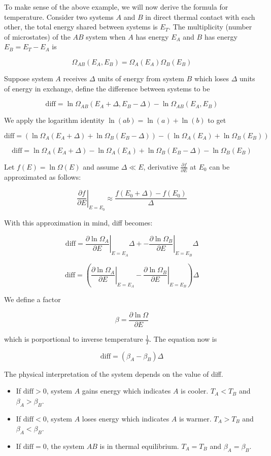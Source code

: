 \documentclass[12pt, a4paper]{article}
\newcounter{exa}
\begin{document}
To make sense of the above example, we will now derive the formula for temperature. Consider two systems $A$ and $B$ in direct thermal contact with each other, the total energy shared between systems is $E_T$. The multiplicity (number of microstates) of the $AB$ system when $A$ has energy $E_A$ and $B$ has energy $E_B=E_T-E_A$ is

$$\Omega_{AB}(E_A, E_B)=\Omega_A(E_A)\Omega_B(E_B)$$

Suppose system $A$ receives $\Delta$ units of energy from system $B$ which loses $\Delta$ units of energy in exchange, define the difference between systems to be

$$\text{diff}=\ln\Omega_{AB}(E_A+\Delta, E_B-\Delta)-\ln\Omega_{AB}(E_A, E_B)$$

We apply the logarithm identity $\ln(ab)=\ln(a)+\ln(b)$ to get

$$\text{diff}=(\ln\Omega_A(E_A+\Delta)+\ln\Omega_B(E_B-\Delta))-(\ln\Omega_A(E_A)+\ln\Omega_B(E_B))$$

$$\text{diff}=\ln\Omega_A(E_A+\Delta)-\ln\Omega_A(E_A)+\ln\Omega_B(E_B-\Delta)-\ln\Omega_B(E_B)$$

Let $f(E)=\ln\Omega(E)$ and assume $\Delta\ll E$, derivative $\frac{\partial f}{\partial E}$ at $E_0$ can be approximated as follows:

$$\left.\frac{\partial f}{\partial E}\right\vert_{E=E_0} \approx \frac{f(E_0+\Delta)-f(E_0)}{\Delta}$$

With this approximation in mind, diff becomes:

$$\text{diff}=\left.\frac{\partial \ln\Omega_A}{\partial E}\right\vert_{E=E_A}\Delta+-\left.\frac{\partial \ln\Omega_B}{\partial E}\right\vert_{E=E_B}\Delta$$

$$\text{diff}=\left(\left.\frac{\partial \ln\Omega_A}{\partial E}\right\vert_{E=E_A}-\left.\frac{\partial \ln\Omega_B}{\partial E}\right\vert_{E=E_B}\right)\Delta$$

We define a factor

$$\beta=\frac{\partial \ln\Omega}{\partial E}$$

which is porportional to inverse temperature $\frac{1}{T}$. The equation now is

$$\boxed{\text{diff}=\left(\beta_A-\beta_B\right)\Delta}$$

The physical interpretation of the system depends on the value of diff.

\begin{itemize}
  \item If $\text{diff}>0$, system $A$ gains energy which indicates $A$ is cooler. $T_A<T_B$ and $\beta_A>\beta_B$.
  \item If $\text{diff}<0$, system $A$ loses energy which indicates $A$ is warmer. $T_A>T_B$ and $\beta_A<\beta_B$.
  \item If $\text{diff}=0$, the system $AB$ is in thermal equilibrium. $T_A=T_B$ and $\beta_A=\beta_B$.
\end{itemize}
\end{document}
